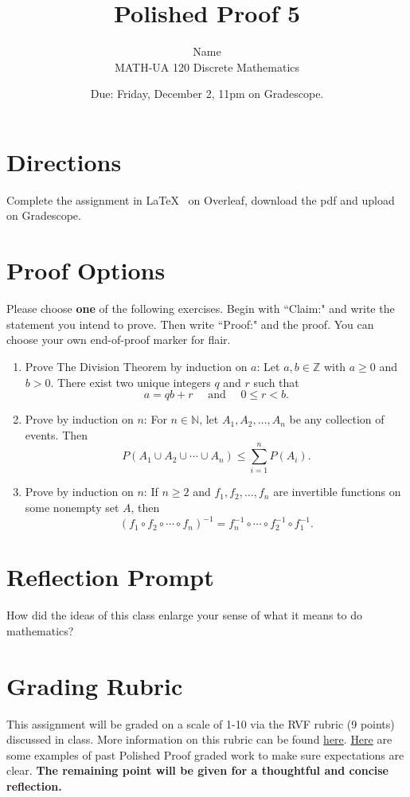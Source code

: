 \documentclass{article}
\title{Polished Proof 5}
\author{%
	Name
	\\
	MATH-UA 120 Discrete Mathematics
}
\date{Due: Friday, December 2, 11pm on Gradescope.}
\theoremstyle{definition}
\begin{document}
	\maketitle
	
	\section*{Directions}

Complete the assignment in \LaTeX~  on Overleaf, download the pdf and upload on Gradescope.


\section*{Proof Options}

Please choose \textbf{one} of the following exercises. Begin with ``Claim:" and write the statement you intend to prove. Then write ``Proof:" and the proof. You can choose your own end-of-proof marker for flair.

\begin{enumerate}
	\item  Prove The Division Theorem by induction on $a$: Let $a, b\in\mathbb{Z}$ with $a\geq 0$ and $b>0$. There exist two unique integers $q$ and $r$ such that 
	\[ a=qb+r \quad \text{ and } \quad 0\leq r<b.\] 
	\item Prove by induction on $n$: For $n\in \mathbb{N}$, let $A_1, A_2, \dots, A_n$ be any collection of events. Then 
	\[ P\left( A_1\cup A_2 \cup \cdots \cup A_n\right) \leq \sum_{i=1}^n P(A_i).\]
	\item Prove by induction on $n$: If $n\geq 2$ and $f_1, f_2, \dots, f_n$ are invertible functions on some nonempty set $A$, then 
	\[ (f_1 \circ f_2 \circ \cdots \circ f_n)^{-1} = f_n^{-1} \circ \cdots \circ f_2^{-1} \circ f_1^{-1}.\]
\end{enumerate}

\section*{Reflection Prompt}
How did the ideas of this class enlarge your sense of what it means to do mathematics?

\section*{Grading Rubric}
This assignment will be graded on a scale of 1-10 via the RVF rubric (9 points) discussed in class. More information on this rubric can be found \href{https://drive.google.com/file/d/1P0OBjw-GkX64uCpYcqYmXARapf9MwaiI/view?usp=sharing}{here}. \href{https://drive.google.com/file/d/1KAFQ7GBFpfUkyTBRZ30h5o6nXWwYDSML/view?usp=sharing}{Here} are some examples of past Polished Proof graded work to make sure expectations are clear. \textbf{The remaining point will be given for a thoughtful and concise reflection.}


	
\end{document}

